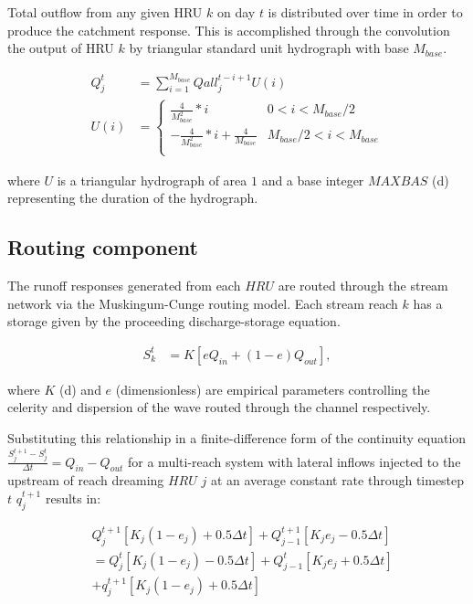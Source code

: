 Total outflow from any given HRU $k$ on day $t$ is distributed over time in order to produce the catchment response. This is accomplished through the convolution the output of HRU $k$ by triangular standard unit hydrograph with base $M_{base}$.

\begin{align}
Q_j^t &= \sum_{i=1}^{M_{base}} Qall_j^{t-i+1} U(i) \\
U(i) &= \left\{
\begin{array}{ll}
\frac{4}{M_{base}^2}*i & 0 < i < M_{base}/2 \\
-\frac{4}{M_{base}^2}*i + \frac{4}{M_{base}} &  M_{base}/2 < i < M_{base} \\
\end{array}
\right.
\end{align}

\noindent where $U$ is a triangular hydrograph of area $1$ and a base integer $MAXBAS$ (\si{\day}) representing the duration of the hydrograph.

\subsection{Routing component}

The runoff responses generated from each $HRU$ are routed through the stream network via the Muskingum-Cunge routing model. Each stream reach $k$ has a storage given by the proceeding discharge-storage equation.

\begin{align}
S_k^t &= K\left[eQ_{in} + (1 - e)Q_{out} \right],
\end{align}

where $K$ (\si{\day}) and $e$ (dimensionless) are empirical parameters controlling the celerity and dispersion of the wave routed through the channel respectively.

Substituting this relationship in a finite-difference form of the continuity equation $\frac{S_j^{t+1} - S_j^{t}}{\Delta t} = Q_{in} - Q_{out}$ for a multi-reach system with lateral inflows injected to the upstream of reach dreaming $HRU$ $j$ at an average constant rate through timestep $t$ $q_{j}^{t+1}$ results in:

\begin{align}
&Q_j^{t+1}\left[K_j(1 - e_j) + 0.5\Delta t  \right] + Q_{j-1}^{t+1}\left[K_je_j - 0.5\Delta t  \right]  \\
&= Q_j^{t}\left[K_j(1 - e_j) - 0.5\Delta t  \right] + Q_{j-1}^{t}\left[K_je_j + 0.5\Delta t  \right]\\
&+ q_{j}^{t+1}\left[K_j(1 - e_j) + 0.5\Delta t  \right]
\end{align}


